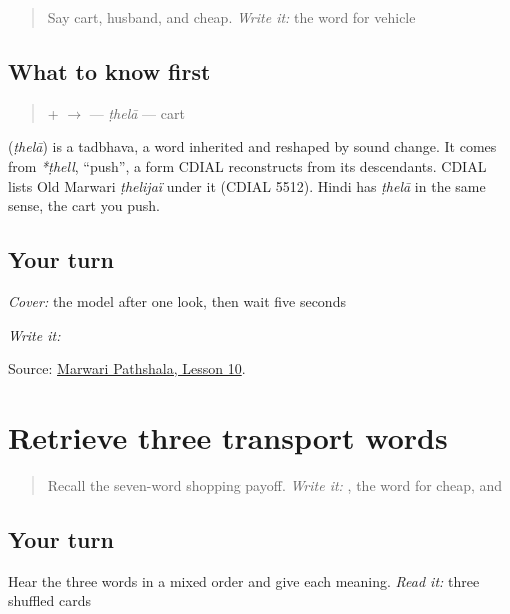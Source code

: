 \label{lesson:MW-C16-thela}



\begin{quote}
Say cart, husband, and cheap. \emph{Write it:} the word for vehicle
\end{quote}

\subsection*{What to know first}
\begin{quote}
\textbf{} + \textbf{} $\to$ \textbf{} — \emph{ṭhelā} — cart
\end{quote}

\begin{cousinweb}
\textbf{} (\emph{ṭhelā}) is a tadbhava, a word inherited and reshaped by sound change. It comes from \emph{*ṭhell}, \textquotedblleft{}push\textquotedblright{}, a form CDIAL reconstructs from its descendants. CDIAL lists Old Marwari \emph{ṭhelijaï} under it (CDIAL 5512). Hindi has \emph{ṭhelā} in the same sense, the cart you push.
\end{cousinweb}

\subsection*{Your turn}
\emph{Cover:} the model after one look, then wait five seconds

\emph{Write it:} \textbf{}

\begin{tcolorbox}[breakable,colback=teal!4,colframe=teal!35!black,title={Before you move on}]
Source: \href{https://www.marwaripathshala.com/marwari-lesson-10-english}{Marwari Pathshala, Lesson 10}.
\end{tcolorbox}
\section[Practice]{Retrieve three transport words}

\label{lesson:MW-R16-transport-three}



\begin{quote}
Recall the seven-word shopping payoff. \emph{Write it:} \textbf{}, the word for cheap, and \textbf{}
\end{quote}

\subsection*{Your turn}
Hear the three words in a mixed order and give each meaning. \emph{Read it:} three shuffled cards

